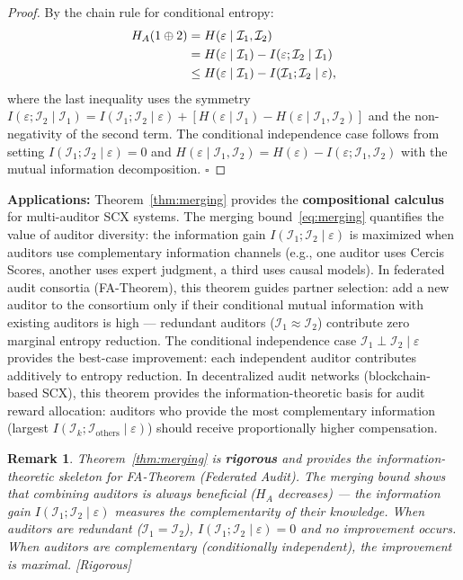 \documentclass[12pt,a4paper]{article}
\newtheorem{remark}[theorem]{Remark}
\newcommand{\rigorous}{\textcolor{green!50!black}{\small\textsf{[Rigorous]}}}
\newcommand{\cI}{\mathcal{I}}
\begin{document}
\begin{proof}
By the chain rule for conditional entropy:
\begin{align}
    H_A(1\oplus 2) &= H(\varepsilon \mid \cI_1, \cI_2) \notag\\
    &= H(\varepsilon \mid \cI_1)
       - I(\varepsilon; \cI_2 \mid \cI_1) \notag\\
    &\leq H(\varepsilon \mid \cI_1)
       - I(\cI_1; \cI_2 \mid \varepsilon),
    \label{eq:merging-proof}
\end{align}
where the last inequality uses the symmetry
$I(\varepsilon;\cI_2\mid\cI_1)=I(\cI_1;\cI_2\mid\varepsilon)+
[H(\varepsilon\mid\cI_1)-H(\varepsilon\mid\cI_1,\cI_2)]$ and the non-negativity
of the second term.  The conditional independence case follows from setting
$I(\cI_1;\cI_2\mid\varepsilon)=0$ and
$H(\varepsilon\mid\cI_1,\cI_2)=H(\varepsilon)-I(\varepsilon;\cI_1,\cI_2)$
with the mutual information decomposition. $\square$
\end{proof}

\medskip\noindent
\textbf{Applications:}
Theorem~\ref{thm:merging} provides the \textbf{compositional calculus} for
multi-auditor SCX systems.  The merging bound~\eqref{eq:merging} quantifies
the value of auditor diversity: the information gain
$I(\cI_1;\cI_2\mid\varepsilon)$ is maximized when auditors use complementary
information channels (e.g., one auditor uses Cercis Scores, another uses
expert judgment, a third uses causal models).  In federated audit consortia
(FA-Theorem), this theorem guides partner selection: add a new auditor to the
consortium only if their conditional mutual information with existing auditors
is high — redundant auditors ($\cI_1\approx\cI_2$) contribute zero marginal
entropy reduction.  The conditional independence case
$\cI_1\perp\cI_2\mid\varepsilon$ provides the best-case improvement: each
independent auditor contributes additively to entropy reduction.  In
decentralized audit networks (blockchain-based SCX), this theorem provides the
information-theoretic basis for audit reward allocation: auditors who provide
the most complementary information (largest $I(\cI_k;\cI_{\text{others}}\mid\varepsilon)$)
should receive proportionally higher compensation.

\begin{remark}
Theorem~\ref{thm:merging} is \textbf{rigorous} and provides the
information-theoretic skeleton for FA-Theorem (Federated Audit).  The merging
bound shows that combining auditors is always beneficial ($H_A$ decreases) —
the information gain $I(\cI_1;\cI_2\mid\varepsilon)$ measures the
complementarity of their knowledge.  When auditors are \emph{redundant}
($\cI_1=\cI_2$), $I(\cI_1;\cI_2\mid\varepsilon)=0$ and no improvement occurs.
When auditors are \emph{complementary} (conditionally independent), the
improvement is maximal.  \rigorous
\end{remark}
\end{document}
